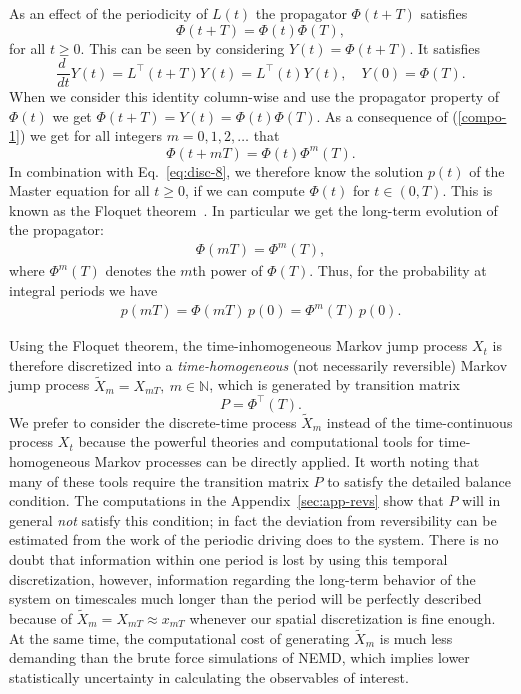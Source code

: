 \documentclass[aps, pre, preprint,unsortedaddress,a4paper,onecolumn,showkeys]{revtex4}
\newcommand{\vect}[1]{#1}
\newcommand{\myphi}{\Phi}
\begin{document}
As an effect of the periodicity of $\vect L(t)$ the propagator $\myphi(t+T)$
satisfies
\begin{equation}\label{compo-1}
\myphi(t+T)=\myphi(t)\myphi(T),
\end{equation}
for all $t\ge 0$. This can be seen by considering $\vect Y(t)=\myphi(t+T)$. It satisfies
\[
\frac{d\ }{dt}\vect Y(t)=\vect L^{\top}(t+T) \vect Y(t)=\vect L^{\top}(t)\vect Y(t),\quad \vect Y(0)=\myphi(T).
\]
When we consider this identity column-wise and use the propagator property of $\myphi(t)$ we get $\myphi(t+T)=\vect Y(t)=\myphi(t)\myphi(T)$. As a consequence of (\ref{compo-1}) we get for all integers $m=0,1,2,\ldots$ that 
\begin{equation}\label{compo-2}
\myphi(t+mT)=\myphi(t)\myphi^m(T).
\end{equation}
In combination with Eq.~\eqref{eq:disc-8}, we therefore
know the solution $\vect p(t)$ of the Master equation for all $t\ge 0$,
if we can compute $\myphi(t)$ for $t\in (0,T)$.
This is known as the Floquet theorem~\cite{floquet1883equations}.
In particular we get the long-term evolution of the propagator:
\begin{align}
\label{eq:floq-13}  
\myphi(mT)=\myphi^m(T),
\end{align}
where $\myphi^m(T)$ denotes the $m$th power of $\myphi(T)$. Thus, for the probability at integral periods we have
\begin{align}
  \label{eq:floq-dynamics}
  p(mT) =  \myphi(mT)\, p(0) = \myphi^m(T)\, p(0).
\end{align}


Using the Floquet theorem, the time-inhomogeneous Markov jump process $X_t$
is therefore discretized into a \emph{time-homogeneous} (not necessarily
reversible) Markov jump process $\tilde X_{m} = X_{mT}, \ m\in\mathbb
N$, which is generated by transition matrix
\begin{equation}\label{P}
\vect P=\myphi^{\top}(T).
\end{equation}
We prefer to consider the discrete-time process $\tilde X_{m}$ instead of the time-continuous process $X_t$
because the powerful theories and
computational tools for time-homogeneous Markov processes can be directly applied. It worth noting that many of these tools require the transition matrix $P$ to satisfy the detailed balance condition. The computations in the Appendix~\ref{sec:app-revs} show that $P$ will in general \emph{not} satisfy this condition; in fact  the deviation {from} reversibility can be estimated from the work of the periodic driving does to the system.
There is no doubt that information within one period is lost by using this temporal
discretization, however, information regarding the long-term behavior of the system on timescales
much longer than the period will be perfectly described because of $\tilde X_{m} = X_{mT}\approx x_{mT}$ whenever our spatial discretization is fine enough.
At the same time,
the computational cost of generating $\tilde X_{m}$ is much less demanding
than the brute force simulations of NEMD, which implies lower
statistically uncertainty in calculating the observables of interest.
\end{document}
